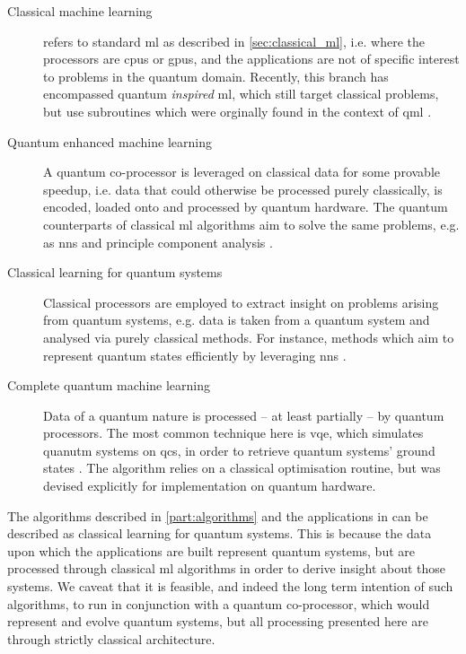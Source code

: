 \begin{description}\label{description:qml}
    \item[Classical machine learning] 
        refers to standard \gls{ml} as described in \cref{sec:classical_ml}, i.e. where the processors are \glspl{cpu} or \glspl{gpu}, 
            and the applications are not of specific interest to problems in the quantum domain. 
        Recently, this branch has encompassed quantum \emph{inspired} \gls{ml}, which still target classical problems, 
            but use subroutines which were orginally found in the context of \gls{qml} \cite{tang2019quantum}.

    \item[Quantum enhanced machine learning] 
        A quantum co-processor is leveraged on classical data for some provable speedup,
        i.e. data that could otherwise be processed purely classically, is encoded, loaded onto and processed by quantum hardware.
        The quantum counterparts of classical \gls{ml} algorithms aim to solve the same problems, 
            e.g. as \glspl{nn} \cite{schuld2014quest, cao2017quantum} and principle component analysis \cite{lloyd2014quantum}. 

    \item[Classical learning for quantum systems] 
        Classical processors are employed to extract insight on problems arising from quantum systems, 
            e.g. data is taken from a quantum system and analysed via purely classical methods.
            For instance, methods which aim to represent quantum states efficiently by leveraging 
            \glspl{nn} \cite{carleo2017solving, torlai2018neural}. 

    \item[Complete quantum machine learning] 
        Data of a quantum nature is processed -- at least partially -- by quantum processors. 
        The most common technique here is \gls{vqe}, which simulates quanutm systems on \glspl{qc}, 
        in order to retrieve quantum systems' ground states \cite{peruzzo2014variational}.
        The algorithm relies on a classical optimisation routine, but was devised explicitly for implementation on quantum hardware. 
\end{description}
\par 

The algorithms described in \cref{part:algorithms} and the applications in  
    can be described as classical learning for quantum systems. 
This is because the data upon which the applications are built represent quantum systems, 
    but are processed through classical \gls{ml} algorithms in order to derive insight about those systems.
We caveat that it is feasible, and indeed the long term intention of such algorithms, 
    to run in conjunction with a quantum co-processor, which would represent and evolve quantum systems, 
    but all processing presented here are through strictly classical architecture.

